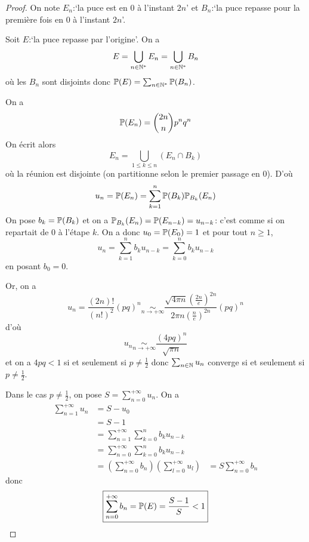 \begin{proof}
    On note $E_{n}$:`la puce est en $0$ à l'instant $2n$' et $B_{n}$:`la puce repasse pour la première fois en $0$ à l'instant $2n$'.

    Soit $E$:`la puce repasse par l'origine'. On a 
    \begin{equation}
        E=\bigcup_{n\in\N^{*}}E_{n}=\bigcup_{n\in\N^{*}}B_{n}
    \end{equation}
    où les $B_{n}$ sont disjoints donc $\P(E)=\sum_{n\in\N^{*}}\P(B_{n})$.

    On a 
    \begin{equation}
        \P(E_{n})=\binom{2n}{n}p^{n}q^{n} 
    \end{equation}
    On écrit alors 
    \begin{equation}
        E_{n}=\bigcup_{1\leqslant k\leqslant n}\left(E_{n}\cap B_{k}\right)
    \end{equation}
    où la réunion est disjointe (on partitionne selon le premier passage en 0). D'où 
    \begin{equation}
        u_{n}=\P(E_{n})=\sum_{k=1}^{n}\P(B_{k})\P_{B_{k}}(E_{n})
    \end{equation}
    On pose $b_{k}=\P(B_{k})$ et on a $\P_{B_{k}}(E_{n})=\P(E_{n-k})=u_{n-k}$: c'est comme si on repartait de 0 à l'étape $k$. On a donc $u_{0}=\P(E_{0})=1$ et pour tout $n\geqslant1$,
    \begin{equation}
        u_{n}=\sum_{k=1}^{n}b_{k}u_{n-k}=\sum_{k=0}^{n}b_{k}u_{n-k}
    \end{equation}
    en posant $b_{0}=0$.

    Or, on a 
    \begin{equation}
        u_{n}=\frac{(2n)!}{(n!)^{2}}(pq)^{n}\underset{n\to+\infty}{\sim}\frac{\sqrt{4\pi n}\left(\frac{2n}{e}\right)^{2n}}{2\pi n\left(\frac{n}{e}\right)^{2n}}(pq)^{n}
    \end{equation}
    d'où 
    \begin{equation}
        u_{n}\underset{n\to+\infty}{\sim}\frac{(4pq)^{n}}{\sqrt{\pi n}}
    \end{equation}
    et on a $4pq<1$ si et seulement si $p\neq\frac{1}{2}$ donc $\sum_{n\in\N}u_{n}$ converge si et seulement si $p\neq\frac{1}{2}$.

    Dans le cas $p\neq\frac{1}{2}$, on pose $S=\sum_{n=0}^{+\infty}u_{n}$. On a 
    \begin{align}
        \sum_{n=1}^{+\infty}u_{n}
        &=S-u_{0}\\
        &=S-1\\
        &=\sum_{n=1}^{+\infty}\sum_{k=0}^{n}b_{k}u_{n-k}\\
        &=\sum_{n=0}^{+\infty}\sum_{k=0}^{n}b_{k}u_{n-k}\\
        &=\left(\sum_{n=0}^{+\infty}b_{n}\right)\left(\sum_{l=0}^{+\infty}u_{l}\right)
        &=S\sum_{n=0}^{+\infty}b_{n}
    \end{align}
    donc 
    \begin{equation}
        \boxed{\sum_{n=0}^{+\infty}b_{n}=\P(E)=\frac{S-1}{S}<1}
    \end{equation}


\end{proof}
